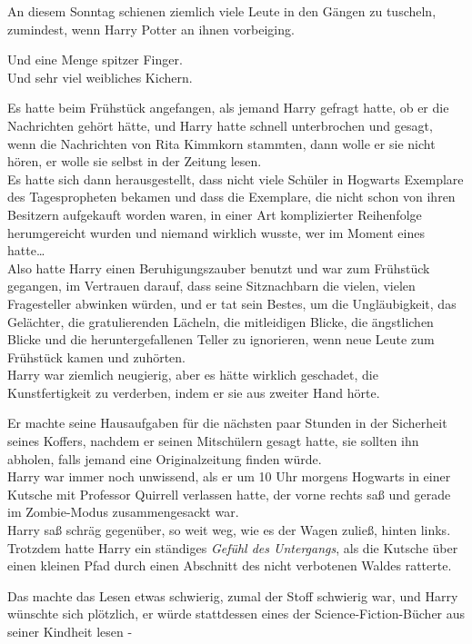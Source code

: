 {An diesem Sonntag schienen ziemlich viele Leute in den Gängen zu tuscheln, zumindest, wenn Harry Potter an ihnen vorbeiging.

Und eine Menge spitzer Finger.\\ Und sehr viel weibliches Kichern.

Es hatte beim Frühstück angefangen, als jemand Harry gefragt hatte, ob er die Nachrichten gehört hätte, und Harry hatte schnell unterbrochen und gesagt, wenn die Nachrichten von Rita Kimmkorn stammten, dann wolle er sie nicht hören, er wolle sie selbst in der Zeitung lesen.\\ Es hatte sich dann herausgestellt, dass nicht viele Schüler in Hogwarts Exemplare des Tagespropheten bekamen und dass die Exemplare, die nicht schon von ihren Besitzern aufgekauft worden waren, in einer Art komplizierter Reihenfolge herumgereicht wurden und niemand wirklich wusste, wer im Moment eines hatte…\\ Also hatte Harry einen Beruhigungszauber benutzt und war zum Frühstück gegangen, im Vertrauen darauf, dass seine Sitznachbarn die vielen, vielen Fragesteller abwinken würden, und er tat sein Bestes, um die Ungläubigkeit, das Gelächter, die gratulierenden Lächeln, die mitleidigen Blicke, die ängstlichen Blicke und die heruntergefallenen Teller zu ignorieren, wenn neue Leute zum Frühstück kamen und zuhörten.\\ Harry war ziemlich neugierig, aber es hätte wirklich geschadet, die Kunstfertigkeit zu verderben, indem er sie aus zweiter Hand hörte.

Er machte seine Hausaufgaben für die nächsten paar Stunden in der Sicherheit seines Koffers, nachdem er seinen Mitschülern gesagt hatte, sie sollten ihn abholen, falls jemand eine Originalzeitung finden würde.\\ Harry war immer noch unwissend, als er um 10 Uhr morgens Hogwarts in einer Kutsche mit Professor Quirrell verlassen hatte, der vorne rechts saß und gerade im Zombie-Modus zusammengesackt war.\\ Harry saß schräg gegenüber, so weit weg, wie es der Wagen zuließ, hinten links. Trotzdem hatte Harry ein ständiges \emph{Gefühl des Untergangs}, als die Kutsche über einen kleinen Pfad durch einen Abschnitt des nicht verbotenen Waldes ratterte.

Das machte das Lesen etwas schwierig, zumal der Stoff schwierig war, und Harry wünschte sich plötzlich, er würde stattdessen eines der Science-Fiction-Bücher aus seiner Kindheit lesen -

}
